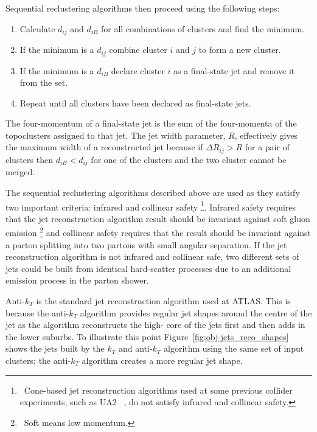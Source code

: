 \noindent Sequential reclustering algorithms then proceed using the following steps:
\vspace{-0.5em}
\begin{enumerate}[nolistsep,leftmargin=*]
  \item Calculate $d_{ij}$ and $d_{iB}$ for all combinations of clusters and find the minimum.
  \item If the minimum is a $d_{ij}$ combine cluster $i$ and $j$ to form a new cluster. 
  \item If the minimum is a $d_{iB}$ declare cluster $i$ as a final-state jet and remove it from the set.  
  \item Repeat until all clusters have been declared as final-state jets. 
\end{enumerate} 

The four-momentum of a final-state jet is the sum of the four-momenta of the topoclusters assigned to that jet.
The jet width parameter, $R$, effectively gives the maximum width of a reconstructed jet
because if $\Delta R_{ij} > R$  for a pair of clusters then
$d_{iB} < d_{ij}$ for one of the clusters %
and the two cluster cannot be merged.

The sequential reclustering algorithms described above are used as they satisfy two important %
criteria: infrared and collinear safety \footnote{\ Cone-based jet reconstruction algorithms used at some previous collider experiments,
  such as UA2 ~\cite{obj-jets_reco_UA2}, do not satisfy infrared and collinear safety.}.
Infrared safety requires that the jet reconstruction algorithm result should be invariant against soft gluon emission \footnote{\ Soft means low momentum.}
and collinear safety requires that the result should be invariant against a parton splitting into two partons with small angular separation.
If the jet reconstruction algorithm is not infrared and collinear safe,
two different sets of jets could be built from identical hard-scatter processes
due to an additional emission process in the parton shower.

Anti-$k_T$ is the standard jet reconstruction algorithm used at ATLAS. %
This is because the anti-$k_T$ algorithm provides regular jet shapes around the centre of the jet as
the algorithm reconstructs the high-\pT{} core of the jets first and then adds in the lower \pT{} suburbs. %
To illustrate this point Figure~\ref{fig:obj-jets_reco_shapes} shows the jets built by the %
$k_T$ and anti-$k_T$ algorithm using the same set of input clusters; the anti-$k_T$ algorithm creates a more regular jet shape.

